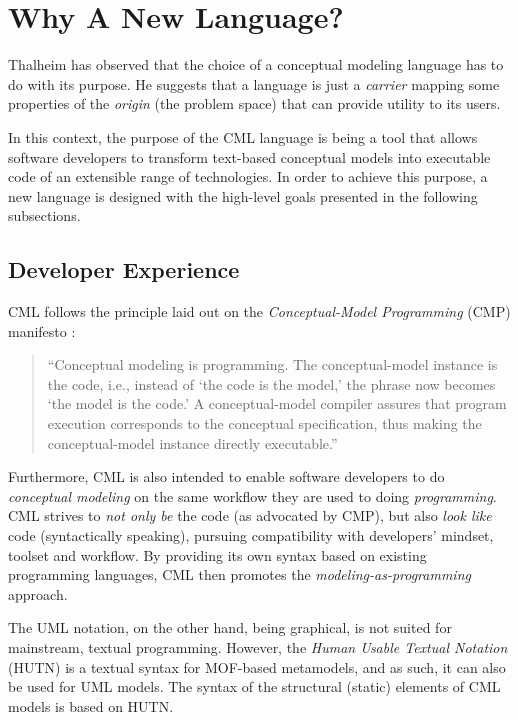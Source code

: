 \section{Why A New Language?}\label{sec:why}

Thalheim \cite{thalheim} has observed that
the choice of a conceptual modeling language has to do with its purpose.
He suggests that
a language is just a \emph{carrier} mapping some properties of the \emph{origin} (the problem space)
that can provide utility to its users. 

In this context, the purpose of the CML language is being a tool
that allows software developers to transform text-based conceptual models
into executable code of an extensible range of technologies.
In order to achieve this purpose,
a new language is designed with the high-level goals presented in the following subsections.

\subsection{Developer Experience}

CML follows the principle laid out on the \emph{Conceptual-Model Programming} (CMP) manifesto \cite{cmp}:

\begin{quote}
``Conceptual modeling is programming.
The conceptual-model instance is the code,
i.e., instead of `the code is the model,'
the phrase now becomes `the model is the code.'
A conceptual-model compiler assures that program execution corresponds to the conceptual specification,
thus making the conceptual-model instance directly executable.''
\end{quote}

Furthermore,
CML is also intended to enable software developers to do \emph{conceptual modeling} on the same workflow they are used to doing \emph{programming}.
CML strives to \emph{not only be} the code (as advocated by CMP),
but also \emph{look like} code (syntactically speaking),
pursuing compatibility with developers' mindset, toolset and workflow.
By providing its own syntax based on existing programming languages,
CML then promotes the \emph{modeling-as-programming} approach. 

The UML \cite{uml} notation, on the other hand,
being graphical,
is not suited for mainstream, textual programming.
However, the \emph{Human Usable Textual Notation} (HUTN) \cite{hutn} is a textual syntax for MOF-based \cite{mof} metamodels,
and as such, it can also be used for UML models.
The syntax of the structural (static) elements of CML models is based on HUTN.

